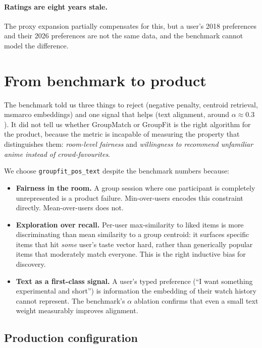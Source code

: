 \documentclass[11pt]{article}
\begin{document}
\paragraph{Ratings are eight years stale.}
The proxy expansion partially compensates for this, but a user's
2018 preferences and their 2026 preferences are not the same data,
and the benchmark cannot model the difference.

\section{From benchmark to product}
\label{sec:design}

The benchmark told us three things to reject (negative penalty,
centroid retrieval, msmarco embeddings) and one signal that helps (text
alignment, around $\alpha \approx 0.3$). It did not tell us whether
GroupMatch or GroupFit is the right algorithm for the product, because
the metric is incapable of measuring the property that distinguishes
them: \emph{room-level fairness} and \emph{willingness to recommend
unfamiliar anime instead of crowd-favourites}.

We choose \texttt{groupfit\_pos\_text} despite the benchmark numbers
because:

\begin{itemize}[leftmargin=*]
\item \textbf{Fairness in the room.} A group session where one
participant is completely unrepresented is a product failure. Min-over-users
encodes this constraint directly. Mean-over-users does not.

\item \textbf{Exploration over recall.} Per-user max-similarity to
liked items is more discriminating than mean similarity to a group
centroid: it surfaces specific items that hit \emph{some} user's
taste vector hard, rather than generically popular items that
moderately match everyone. This is the right inductive bias for
discovery.

\item \textbf{Text as a first-class signal.} A user's typed preference
(``I want something experimental and short'') is information the
embedding of their watch history cannot represent. The benchmark's
$\alpha$ ablation confirms that even a small text weight measurably
improves alignment.
\end{itemize}

\subsection*{Production configuration}
\end{document}
